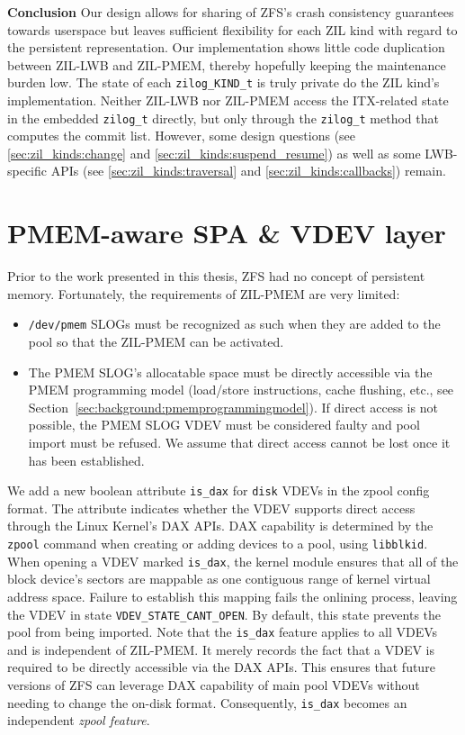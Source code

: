 \documentclass[12pt,a4paper,twoside]{book}
\begin{document}
\textbf{Conclusion}
Our design allows for sharing of ZFS's crash consistency guarantees towards userspace but leaves sufficient flexibility for each ZIL kind with regard to the persistent representation.
Our implementation shows little code duplication between ZIL-LWB and ZIL-PMEM, thereby hopefully keeping the maintenance burden low.
The state of each \lstinline{zilog_KIND_t} is truly private do the ZIL kind's implementation.
Neither ZIL-LWB nor ZIL-PMEM access the ITX-related state in the embedded \lstinline{zilog_t} directly, but only through the \lstinline{zilog_t} method that computes the commit list.
However, some design questions (see \ref{sec:zil_kinds:change} and \ref{sec:zil_kinds:suspend_resume}) as well as some LWB-specific APIs (see \ref{sec:zil_kinds:traversal} and \ref{sec:zil_kinds:callbacks}) remain.

\section{PMEM-aware SPA \& VDEV layer}\label{sec:pmemspavdev}
Prior to the work presented in this thesis, ZFS had no concept of persistent memory.
Fortunately, the requirements of ZIL-PMEM are very limited:
\begin{itemize}[noitemsep]
    \item \texttt{/dev/pmem} SLOGs must be recognized as such when they are added to the pool so that the ZIL-PMEM can be activated.
    \item The PMEM SLOG's allocatable space must be directly accessible via the PMEM programming model (load/store instructions, cache flushing, etc., see Section~\ref{sec:background:pmemprogrammingmodel}).
        If direct access is not possible, the PMEM SLOG VDEV must be considered faulty and pool import must be refused.
        We assume that direct access cannot be lost once it has been established.
\end{itemize}

We add a new boolean attribute \lstinline{is_dax} for \lstinline{disk} VDEVs in the zpool config format.
The attribute indicates whether the VDEV supports direct access through the Linux Kernel's DAX APIs.
DAX capability is determined by the \lstinline{zpool} command when creating or adding devices to a pool, using \lstinline{libblkid}.
When opening a VDEV marked \lstinline{is_dax}, the kernel module ensures that all of the block device's sectors are mappable as one contiguous range of kernel virtual address space.
Failure to establish this mapping fails the onlining process, leaving the VDEV in state \lstinline{VDEV_STATE_CANT_OPEN}.
By default, this state prevents the pool from being imported.
Note that the \lstinline{is_dax} feature applies to all VDEVs and is independent of ZIL-PMEM.
It merely records the fact that a VDEV is required to be directly accessible via the DAX APIs.
This ensures that future versions of ZFS can leverage DAX capability of main pool VDEVs without needing to change the on-disk format.
Consequently, \lstinline{is_dax} becomes an independent \textit{zpool feature}.
\end{document}
